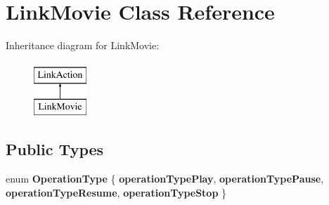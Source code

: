 \hypertarget{class_link_movie}{}\section{Link\+Movie Class Reference}
\label{class_link_movie}
Inheritance diagram for Link\+Movie\+:\begin{figure}[H]
\begin{center}
\leavevmode
\includegraphics[height=2.000000cm]{class_link_movie}
\end{center}
\end{figure}
\subsection*{Public Types}
\begin{DoxyCompactItemize}
\item 
\mbox{\label{class_link_movie_aa88289b01d2c913c2ab3b93c7fe8a8a3}} 
enum {\bfseries Operation\+Type} \{ {\bfseries operation\+Type\+Play}, 
{\bfseries operation\+Type\+Pause}, 
{\bfseries operation\+Type\+Resume}, 
{\bfseries operation\+Type\+Stop}
 \}
\end{DoxyCompactItemize}
